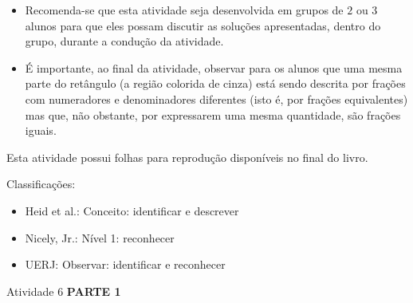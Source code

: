 \documentclass[oneside]{book}
\begin{document}
\begin{multicols}{2}
  
 
\begin{itemize} %
    \item       Recomenda-se que esta atividade seja desenvolvida em grupos de   
    $2$       ou       $3$       alunos para que eles possam discutir as 
soluções apresentadas, dentro do grupo, durante a condução da atividade.
    \item       É importante, ao final da atividade, observar para os alunos que 
uma mesma parte do retângulo (a região colorida de cinza) está sendo descrita 
por frações com numeradores e denominadores diferentes (isto é, por frações 
equivalentes) mas que, não obstante, por expressarem uma mesma quantidade, são 
frações iguais. 
\end{itemize} %
  
  
  Esta atividade possui     folhas para reprodução disponíveis no final do 
livro.
  
  Classificações:  
\begin{itemize} %
    \item       Heid et al.: Conceito: identificar e descrever
    \item       Nicely, Jr.: Nível 1: reconhecer
    \item       UERJ: Observar: identificar e reconhecer
\end{itemize} %

\begin{resposta*}{Atividade 6}
  {\bf PARTE 1}  



\end{resposta*}
\end{multicols}
\end{document}
